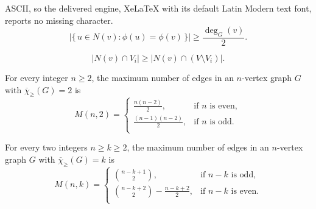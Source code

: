 \documentclass[10pt,a4paper]{amsart}
\newcommand{\mc}{\overline{\chi}_{\geqslant}}
\begin{document}
ASCII, so the delivered engine, XeLaTeX with its default Latin Modern text font, reports no missing character.
\begin{equation} \label{eq:majority-1}
    \bigl|\{\, u \in N(v) : \phi(u) = \phi(v) \,\}\bigr| \ge \frac{\deg_G(v)}{2}.
\end{equation} 

\begin{equation} \label{eq:majority-2}
    |N(v) \cap V_i| \ge |N(v) \cap (V\setminus V_i)|.
\end{equation}

   \begin{theorem} \label{thm:M(n,2)}
       For every integer $n \ge 2$, the maximum number of edges in an $n$-vertex graph $G$ with $\mc(G) =2$ is 
       $$
    M(n,2)= 
    \begin{cases}
	\frac{n(n-2)}{2}, &\text{if $n$ is even},\\
	\frac{(n-1)(n-2)}{2}, &\text{if $n$ is odd}.\\
    \end{cases}
    $$
   \end{theorem}

   \begin{theorem} \label{thm:M(n,k)}
       For every two integers $n \ge k \ge 2$, the maximum number of edges in an $n$-vertex graph $G$ with $\mc(G) =k$ is 
      \begin{equation} \label{eq:thm-M(n,k)}
    M(n,k)= 
    \begin{cases}
	{n-k+1 \choose 2 }, &\text{if $n-k$ is odd},\\
	{n-k+2 \choose 2 }- \frac{n-k+2}{2}, &\text{if $n-k$ is even}.\\
    \end{cases}
    \end{equation}
   \end{theorem}
\end{document}
